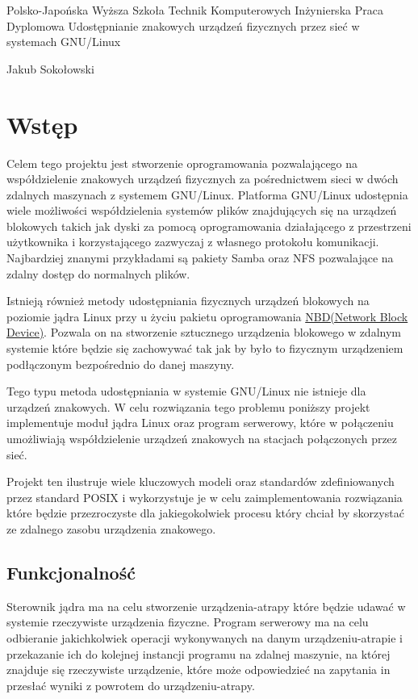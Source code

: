 Polsko-Japońska Wyższa Szkoła Technik Komputerowych Inżynierska Praca
Dyplomowa Udostępnianie znakowych urządzeń fizycznych przez sieć w
systemach GNU/Linux

Jakub Sokołowski

\section{Wstęp}

Celem tego projektu jest stworzenie oprogramowania pozwalającego na
współdzielenie znakowych urządzeń fizycznych za pośrednictwem sieci w
dwóch zdalnych maszynach z systemem GNU/Linux. Platforma GNU/Linux
udostępnia wiele możliwości współdzielenia systemów plików znajdujących
się na urządzeń blokowych takich jak dyski za pomocą oprogramowania
działającego z przestrzeni użytkownika i korzystającego zazwyczaj z
własnego protokołu komunikacji. Najbardziej znanymi przykładami są
pakiety Samba oraz NFS pozwalające na zdalny dostęp do normalnych
plików.

Istnieją również metody udostępniania fizycznych urządzeń blokowych na
poziomie jądra Linux przy u życiu pakietu oprogramowania
\href{http://nbd.sourceforge.net/}{NBD(Network Block Device)}. Pozwala
on na stworzenie sztucznego urządzenia blokowego w zdalnym systemie
które będzie się zachowywać tak jak by było to fizycznym urządzeniem
podłączonym bezpośrednio do danej maszyny.

Tego typu metoda udostępniania w systemie GNU/Linux nie istnieje dla
urządzeń znakowych. W celu rozwiązania tego problemu poniższy projekt
implementuje moduł jądra Linux oraz program serwerowy, które w
połączeniu umożliwiają współdzielenie urządzeń znakowych na stacjach
połączonych przez sieć.

Projekt ten ilustruje wiele kluczowych modeli oraz standardów
zdefiniowanych przez standard POSIX i wykorzystuje je w celu
zaimplementowania rozwiązania które będzie przezroczyste dla
jakiegokolwiek procesu który chciał by skorzystać ze zdalnego zasobu
urządzenia znakowego.

\subsection{Funkcjonalność}

Sterownik jądra ma na celu stworzenie urządzenia-atrapy które będzie
udawać w systemie rzeczywiste urządzenia fizyczne. Program serwerowy ma
na celu odbieranie jakichkolwiek operacji wykonywanych na danym
urządzeniu-atrapie i przekazanie ich do kolejnej instancji programu na
zdalnej maszynie, na której znajduje się rzeczywiste urządzenie, które
może odpowiedzieć na zapytania in przesłać wyniki z powrotem do
urządzeniu-atrapy.

